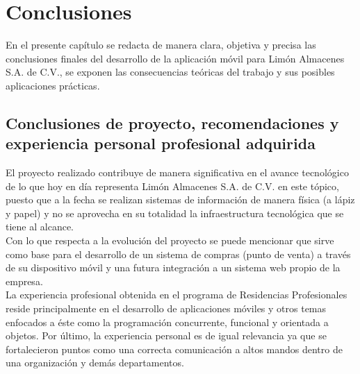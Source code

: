 \chapter{Conclusiones}

En el presente capítulo se redacta de manera clara, objetiva y precisa las conclusiones finales del desarrollo de la aplicación móvil para Limón Almacenes S.A. de C.V., se exponen las consecuencias teóricas del trabajo y sus posibles aplicaciones prácticas.

\section{Conclusiones de proyecto, recomendaciones y experiencia personal profesional adquirida}

El proyecto realizado contribuye de manera significativa en el avance tecnológico de lo que hoy en día representa Limón Almacenes S.A. de C.V. en este tópico, puesto que a la fecha se realizan sistemas de información de manera física (a lápiz y papel) y no se aprovecha en su totalidad la infraestructura tecnológica que se tiene al alcance.\\

Con lo que respecta a la evolución del proyecto se puede mencionar que sirve como base para el desarrollo de un sistema de compras (punto de venta) a través de su dispositivo móvil y una futura integración a un sistema web propio de la empresa.\\

La experiencia profesional obtenida en el programa de Residencias Profesionales reside principalmente en el desarrollo de aplicaciones móviles y otros temas enfocados a éste como la programación concurrente, funcional y orientada a objetos. Por último, la experiencia personal es de igual relevancia ya que se fortalecieron puntos como una correcta comunicación a altos mandos dentro de una organización y demás departamentos.